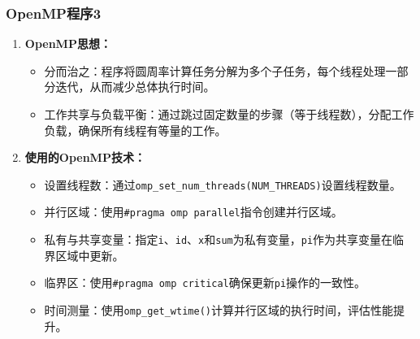 \documentclass{article}
\begin{document}
\subsubsection{OpenMP程序3}
\begin{enumerate}
    \item \textbf{OpenMP思想：}
    \begin{itemize}
        \item 分而治之：程序将圆周率计算任务分解为多个子任务，每个线程处理一部分迭代，从而减少总体执行时间。
        \item 工作共享与负载平衡：通过跳过固定数量的步骤（等于线程数），分配工作负载，确保所有线程有等量的工作。
    \end{itemize}
    
    \item \textbf{使用的OpenMP技术：}
    \begin{itemize}
        \item 设置线程数：通过\texttt{omp\_set\_num\_threads(NUM\_THREADS)}设置线程数量。
        \item 并行区域：使用\texttt{\#pragma omp parallel}指令创建并行区域。
        \item 私有与共享变量：指定\texttt{i}、\texttt{id}、\texttt{x}和\texttt{sum}为私有变量，\texttt{pi}作为共享变量在临界区域中更新。
        \item 临界区：使用\texttt{\#pragma omp critical}确保更新\texttt{pi}操作的一致性。
        \item 时间测量：使用\texttt{omp\_get\_wtime()}计算并行区域的执行时间，评估性能提升。
    \end{itemize}
\end{enumerate}
\end{document}
